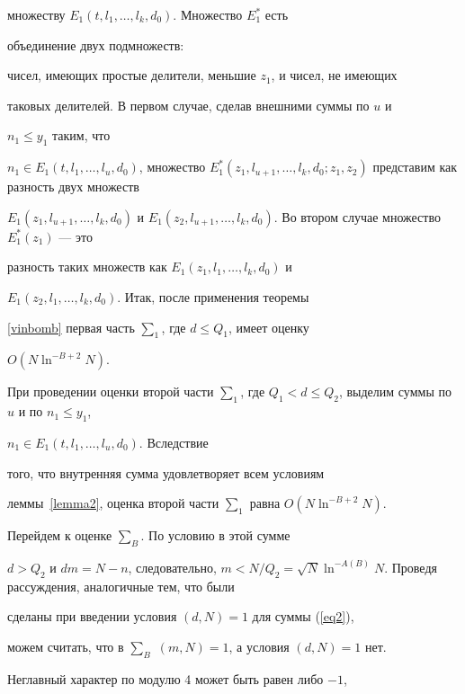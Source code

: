 множеству $E_1(t,l_1,\dotsc,l_k,d_0)$. Множество $E^*_1$ есть


объединение двух подмножеств:


чисел, имеющих простые делители, меньшие $z_1$, и чисел, не имеющих


таковых делителей. В первом случае, сделав внешними суммы по $u$ и


$n_1 \le y_1$ таким, что


$n_1\in E_1(t,l_1,\dotsc,l_u,d_0)$, множество $E^\ast_1(z_1, l_{u+1},


\dotsc, l_k, d_0; z_1, z_2)$ представим как разность двух множеств


$E_1(z_1, l_{u+1}, \dotsc, l_k, d_0)$ и $E_1(z_2, l_{u+1}, \dotsc,


l_k, d_0)$. Во втором случае множество $E^\ast_1(z_1)$ --- это


разность таких множеств как $E_1(z_1, l_1, \dotsc, l_k, d_0)$ и


$E_1(z_2, l_1, \dotsc, l_k, d_0)$. Итак, после применения теоремы


\ref{vinbomb} первая часть $\sum_1$, где $d \le Q_1$, имеет оценку


$O(N \ln^{-B+2} N)$.





При проведении оценки второй части $\sum_1$, где $Q_1 < d


\le Q_2$, выделим суммы по $u$ и по $n_1 \le y_1$,


$n_1\in E_1(t,l_1,\dotsc,l_u,d_0)$. Вследствие


того, что внутренняя сумма удовлетворяет всем условиям


леммы~\ref{lemma2}, оценка второй части $\sum_1$ равна $O(N


\ln^{-B+2} N)$.





Перейдем к оценке $\sum_B$. По условию в этой сумме


$d> Q_2$ и $dm = N-n$, следовательно, $m < N / Q_2 = \sqrt N


\ln^{-A(B)} N$. Проведя рассуждения, аналогичные тем, что были


сделаны при введении условия $(d,N)=1$ для суммы (\ref{eq2}),


можем считать, что в $\sum_B$\; $(m,N)=1$, а условия $(d,N)=1$ нет.





Неглавный характер по модулю 4 может быть равен либо $-1$,


